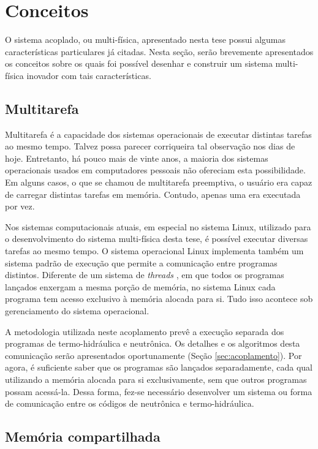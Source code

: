 \section{Conceitos}
\label{sec:conc}

O sistema acoplado, ou multi-física, apresentado nesta tese possui algumas características
particulares já citadas. Nesta seção, serão brevemente apresentados os conceitos sobre os quais
foi possível desenhar e construir um sistema multi-física inovador com tais características.

\subsection{Multitarefa}
\label{subsec:mt}

Multitarefa é a capacidade dos sistemas operacionais de executar distintas tarefas ao mesmo tempo.
Talvez possa parecer corriqueira tal observação nos dias de hoje. Entretanto, há pouco mais de vinte
anos, a maioria dos sistemas operacionais usados em computadores pessoais não ofereciam esta
possibilidade. Em alguns casos, o que se chamou de multitarefa preemptiva, o usuário era capaz de
carregar distintas tarefas em memória. Contudo, apenas uma era executada por vez.

Nos sistemas computacionais atuais, em especial no sistema Linux, utilizado para o desenvolvimento
do sistema multi-física desta tese, é possível executar diversas tarefas ao mesmo tempo. O sistema operacional
Linux implementa também um sistema padrão de execução que permite a comunicação entre programas distintos. Diferente
de um sistema de \textit{threads} \cite{Walli1995},
em que todos os programas lançados enxergam a mesma
porção de memória, no sistema Linux cada programa tem acesso exclusivo à memória alocada para si.
Tudo isso acontece sob gerenciamento do sistema operacional.

A metodologia utilizada neste acoplamento prevê a execução separada dos programas de termo-hidráulica
e neutrônica. Os detalhes e os algoritmos desta comunicação serão apresentados oportunamente (Seção \ref{sec:acoplamento}).
Por agora, é suficiente saber que os programas são lançados separadamente, cada qual utilizando a memória
alocada para si exclusivamente, sem que outros programas possam acessá-la. Dessa forma, fez-se necessário
desenvolver um sistema ou forma de comunicação entre os códigos de neutrônica e termo-hidráulica.

\subsection{Memória compartilhada}
\label{subsec:mc}

